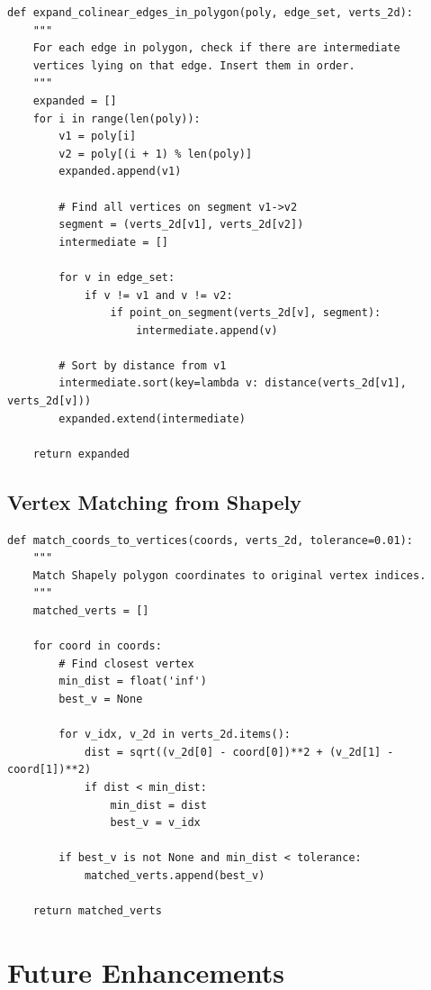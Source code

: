 \documentclass[11pt]{article}
\begin{document}
\begin{lstlisting}[caption={Insert colinear intermediate vertices},label={lst:expand}]
def expand_colinear_edges_in_polygon(poly, edge_set, verts_2d):
    """
    For each edge in polygon, check if there are intermediate
    vertices lying on that edge. Insert them in order.
    """
    expanded = []
    for i in range(len(poly)):
        v1 = poly[i]
        v2 = poly[(i + 1) % len(poly)]
        expanded.append(v1)
        
        # Find all vertices on segment v1->v2
        segment = (verts_2d[v1], verts_2d[v2])
        intermediate = []
        
        for v in edge_set:
            if v != v1 and v != v2:
                if point_on_segment(verts_2d[v], segment):
                    intermediate.append(v)
        
        # Sort by distance from v1
        intermediate.sort(key=lambda v: distance(verts_2d[v1], verts_2d[v]))
        expanded.extend(intermediate)
    
    return expanded
\end{lstlisting}

\subsection{Vertex Matching from Shapely}

\begin{lstlisting}[caption={Convert Shapely polygon back to vertex indices},label={lst:match}]
def match_coords_to_vertices(coords, verts_2d, tolerance=0.01):
    """
    Match Shapely polygon coordinates to original vertex indices.
    """
    matched_verts = []
    
    for coord in coords:
        # Find closest vertex
        min_dist = float('inf')
        best_v = None
        
        for v_idx, v_2d in verts_2d.items():
            dist = sqrt((v_2d[0] - coord[0])**2 + (v_2d[1] - coord[1])**2)
            if dist < min_dist:
                min_dist = dist
                best_v = v_idx
        
        if best_v is not None and min_dist < tolerance:
            matched_verts.append(best_v)
    
    return matched_verts
\end{lstlisting}

\section{Future Enhancements}
\end{document}
